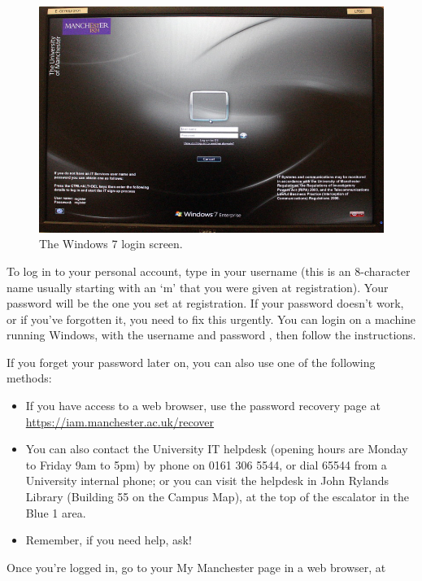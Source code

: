 \begin{figure}
\centerline{\includegraphics[width=15cm]{images/TH-win-login}}
\caption{The Windows 7 login screen.}
\label{figure:login-screen}
\end{figure}

To log in to your personal account, type in your username (this is an
8-character name usually starting with an `m' that you were given at registration). Your password will
be the one  you set at registration. If your password doesn't work, or if you've forgotten it,
you need to fix this urgently. You can login on a machine running Windows,  with the username  and password , then follow the instructions.

If you forget your password later on, you can also use one of the following methods:
\begin{itemize}
\item If you have access to a web browser, use the password recovery page at\\ \url{https://iam.manchester.ac.uk/recover}
\item You can also contact the University IT helpdesk (opening hours are Monday to Friday 9am to 5pm) by phone on 0161 306 5544, or dial 65544 from a University internal phone; or you can visit the helpdesk in John Rylands Library (Building 55 on
the Campus Map), at the top of the escalator in the Blue 1 area.
\item Remember, if you need help, ask!
\end{itemize}

Once you're logged in, go to your My Manchester page in a web browser, at

